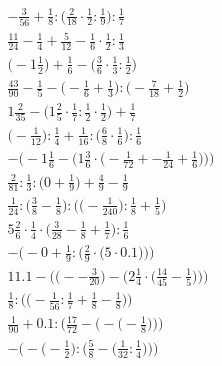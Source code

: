 \documentclass[8pt]{article}
\begin{document}
\begin{align}
-\frac{3}{56} + \frac{1}{8} : \big(\frac{2}{18} \cdot \frac{1}{2} : \frac{1}{9}\big) : \frac{1}{7} \\
\frac{11}{24} - \frac{1}{4} + \frac{5}{12} - \frac{1}{6} \cdot \frac{1}{2} : \frac{1}{3} \\
\big(-1\frac{1}{2}\big) + \frac{1}{6} - \big(\frac{3}{6} \cdot \frac{1}{3} : \frac{1}{2}\big) \\
\frac{43}{90} - \frac{1}{5} - \big(-\frac{1}{6} + \frac{1}{3}\big) : \big(-\frac{7}{18} + \frac{1}{2}\big) \\
1\frac{2}{35} - \big(1\frac{2}{5} \cdot \frac{1}{7} : \frac{1}{2} \cdot \frac{1}{2}\big) + \frac{1}{7} \\
\big(-\frac{1}{12}\big) : \frac{1}{4} + \frac{1}{16} : \big(\frac{6}{8} \cdot \frac{1}{6}\big) : \frac{1}{6} \\
-\bigg(-1\frac{1}{6} - \Big(1\frac{3}{6} \cdot \big(-\frac{1}{72} + -\frac{1}{24} + \frac{1}{6}\big)\Big)\bigg) \\
\frac{2}{81} : \frac{1}{3} : \big(0 + \frac{1}{9}\big) + \frac{4}{9} - \frac{1}{9} \\
\frac{1}{24} : \Big(\frac{3}{8} - \frac{1}{8}\Big) : \Big(\big(-\frac{1}{240}\big) : \frac{1}{8} + \frac{1}{5}\Big) \\
5\frac{2}{6} \cdot \frac{1}{4} \cdot \big(\frac{3}{28} - \frac{1}{8} + \frac{1}{7}\big) : \frac{1}{6} \\
-\bigg(-0 + \frac{1}{9} : \Big(\frac{2}{9} \cdot \big(5 \cdot 0.1\big)\Big)\bigg) \\
11.1 - \bigg(\Big(--\frac{3}{20}\Big) - \Big(2\frac{1}{4} \cdot \big(\frac{14}{45} - \frac{1}{5}\big)\Big)\bigg) \\
\frac{1}{8} : \Big(\big(-\frac{1}{56} : \frac{1}{7} + \frac{1}{8} - \frac{1}{8}\big)\Big) \\
\frac{1}{90} + 0.1 : \bigg(\frac{17}{72} - \Big(-\big(-\frac{1}{8}\big)\Big)\bigg) \\
-\bigg(-\Big(-\frac{1}{2}\Big) : \Big(\frac{5}{8} - \big(\frac{1}{32} : \frac{1}{4}\big)\Big)\bigg)
\end{align}
\end{document}
